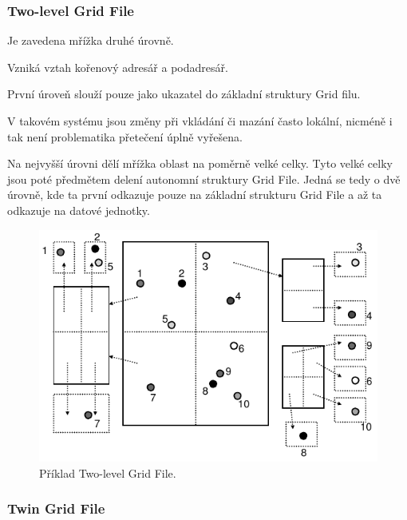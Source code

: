 \subsubsection{Two-level Grid File}

\begin{compactitem}
    \item Je zavedena mřížka druhé úrovně. \begin{compactitem}
        \item Vzniká vztah kořenový adresář a podadresář.
        \item První úroveň slouží pouze jako ukazatel do základní struktury Grid filu.
    \end{compactitem}

    \item V takovém systému jsou změny při vkládání či mazání často lokální, nicméně i tak není problematika přetečení úplně vyřešena.

    \item Na nejvyšší úrovni dělí mřížka oblast na poměrně velké celky. Tyto velké celky jsou poté předmětem delení autonomní struktury Grid File. Jedná se tedy o dvě úrovně, kde ta první odkazuje pouze na základní strukturu Grid File a až ta odkazuje na datové jednotky.
\end{compactitem}

\begin{figure}[H]
    \centering
    \includegraphics[width=0.75\linewidth]{grid_file_two_level.pdf}
    \caption{Příklad Two-level Grid File.}
\end{figure}

\subsubsection{Twin Grid File}

